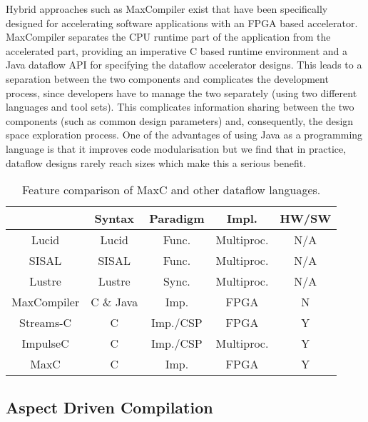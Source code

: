 Hybrid approaches such as MaxCompiler \cite{MaxelerTechnologies:2012}
exist that have been specifically designed for accelerating software
applications with an FPGA based accelerator. MaxCompiler separates the
CPU runtime part of the application from the accelerated part,
providing an imperative C based runtime environment and a Java
dataflow API for specifying the dataflow accelerator designs. This
leads to a separation between the two components and complicates the
development process, since developers have to manage the two
separately (using two different languages and tool sets). This
complicates information sharing between the two components (such as
common design parameters) and, consequently, the design space
exploration process. One of the advantages of using Java as a
programming language is that it improves code modularisation but we
find that in practice, dataflow designs rarely reach sizes which make
this a serious benefit.

\begin{table}[!h]
  \renewcommand{\arraystretch}{1.3}
  \centering
  \caption{Feature comparison of MaxC and other dataflow languages.}
  \label{table:feature-comparison}
  \begin{tabular}{ c |  c |  c |  c |  c }
    \hline
    \           & \bf{Syntax} & \bf{Paradigm} & \bf{Impl.} & \bf{HW/SW} \\
    \hline \hline
    Lucid       & Lucid       & Func.         & Multiproc. & N/A        \\
    SISAL       & SISAL       & Func.         & Multiproc. & N/A        \\
    Lustre      & Lustre      & Sync.         & Multiproc. & N/A        \\
    MaxCompiler & C \& Java   & Imp.          & FPGA       & N          \\
    Streams-C   & C           & Imp./CSP      & FPGA       & Y          \\
    ImpulseC    & C           & Imp./CSP      & Multiproc. & Y          \\
    MaxC        & C           & Imp.           & FPGA       & Y          \\
  \end{tabular}
\end{table}

\subsection{Aspect Driven Compilation}

